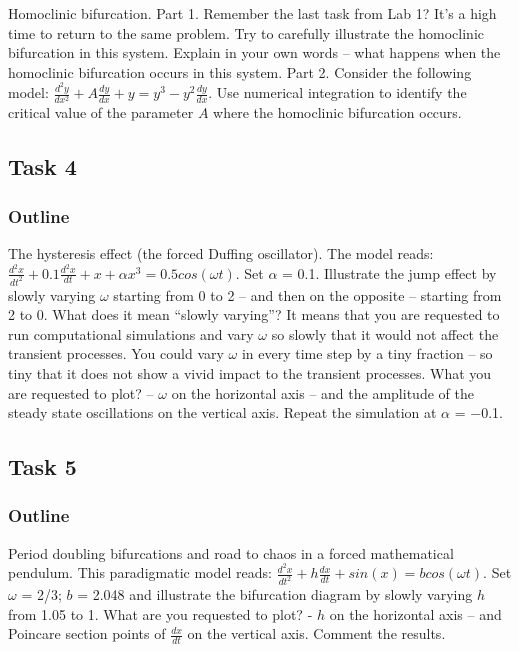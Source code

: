 \documentclass[11pt]{article}
\begin{document}
Homoclinic bifurcation. Part 1. Remember the last task from Lab 1? It's
a high time to return to the same problem. Try to carefully illustrate
the homoclinic bifurcation in this system. Explain in your own words --
what happens when the homoclinic bifurcation occurs in this system. Part
2. Consider the following model:
\(\frac{d^2 y}{dx^2} + A\frac{dy}{dx} + y = y^3 - y^2\frac{dy}{dx}\).
Use numerical integration to identify the critical value of the
parameter \(A\) where the homoclinic bifurcation occurs.

    \hypertarget{task-4}{%
\subsection{Task 4}\label{task-4}}

\hypertarget{outline}{%
\subsubsection{Outline}\label{outline}}

The hysteresis effect (the forced Duffing oscillator). The model reads:
\(\frac{d^2 x}{dt^2} + 0.1\frac{d^2 x}{dt} + x + \alpha x^3 = 0.5 cos(\omega t)\).
Set \(\alpha\) = 0.1. Illustrate the jump effect by slowly varying
\(\omega\) starting from 0 to 2 -- and then on the opposite -- starting
from 2 to 0. What does it mean ``slowly varying''? It means that you are
requested to run computational simulations and vary \(\omega\) so slowly
that it would not affect the transient processes. You could vary
\(\omega\) in every time step by a tiny fraction -- so tiny that it does
not show a vivid impact to the transient processes. What you are
requested to plot? -- \(\omega\) on the horizontal axis -- and the
amplitude of t\textbar{}he steady state oscillations on the vertical
axis. Repeat the simulation at \(\alpha\) = −0.1.

    \hypertarget{task-5}{%
\subsection{Task 5}\label{task-5}}

\hypertarget{outline}{%
\subsubsection{Outline}\label{outline}}

Period doubling bifurcations and road to chaos in a forced mathematical
pendulum. This paradigmatic model reads:
\(\frac{d^2 x}{dt^2} + h \frac{dx}{dt} + sin(x) = bcos(\omega t)\). Set
\(\omega\) = 2/3; \(b\) = 2.048 and illustrate the bifurcation diagram
by slowly varying \(h\) from 1.05 to 1. What are you requested to plot?
- \(h\) on the horizontal axis -- and Poincare section points of
\(\frac{dx}{dt}\) on the vertical axis. Comment the results.


    
    
    
    
\end{document}

